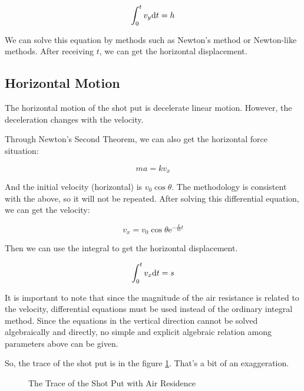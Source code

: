 \documentclass{article}
\begin{document}
\begin{equation}
    \int^t_0v_y\mathrm{d} t=h
\end{equation}

We can solve this equation by methods such as Newton's method or Newton-like methods. After receiving $t$, we can get the horizontal displacement.

\subsection{Horizontal Motion}

The horizontal motion of the shot put is decelerate linear motion. However, the deceleration changes with the velocity.

Through Newton's Second Theorem, we can also get the horizontal force situation:

\begin{equation*}
    ma = kv_x
\end{equation*}

And the initial velocity (horizontal) is $v_0\cos\theta$. The methodology is consistent with the above, so it will not be repeated. After solving this differential equation, we can get the velocity:

\begin{equation}
    v_x=v_0\cos\theta\mathrm{e}^{-\frac{k}{m}t}
\end{equation}

Then we can use the integral to get the horizontal displacement.

\begin{equation}
    \int^t_0v_x\mathrm{d} t=s
\end{equation}

It is important to note that since the magnitude of the air resistance is related to the velocity, differential equations must be used instead of the ordinary integral method. Since the equations in the vertical direction cannot be solved algebraically and directly, no simple and explicit algebraic relation among parameters above can be given.

So, the trace of the shot put is in the figure \ref{fig:trace-with-residence}. That's a bit of an exaggeration.

\begin{figure}[H]
    \centering
    \caption{The Trace of the Shot Put with Air Residence}
    \label{fig:trace-with-residence}
\end{figure}
\end{document}
